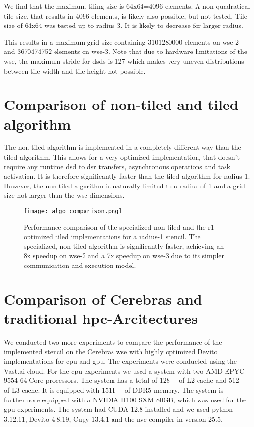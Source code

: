 We find that the maximum tiling size  is 64x64=4096 elements.
A non-quadratical tile size, that results in 4096 elements, is likely also possible, but not tested.
Tile size of 64x64 was tested up to radius 3. It is likely to decrease for larger radius.

This results in a maximum grid size containing \num{3101280000} elements on wse-2 and \num{3670474752} elements on wse-3.
Note that due to hardware limitations of the \ac{wse}, the maximum stride for \acp{dsd} is \num{127} which makes very uneven distributions between tile width and tile height not possible.


\section{Comparison of non-tiled and tiled algorithm}

The non-tiled algorithm is implemented in a completely different way than the tiled algorithm.
This allows for a very optimized implementation, that doesn't require any runtime \ac{dsd} to \ac{dsr} transfers, asynchronous operations and task activation.
It is therefore significantly faster than the tiled algorithm for radius 1.
However, the non-tiled algorithm is naturally limited to a radius of 1 and a grid size not larger than the \ac{wse} dimensions.

\begin{figure}[h]
    \centering
    \texttt{[image: algo\_comparison.png]}
    \caption{Performance comparison of the specialized non-tiled and the r1-optimized tiled implementations for a radius-1 stencil. The specialized, non-tiled algorithm is significantly faster, achieving an 8x speedup on \ac{wse}-2 and a 7x speedup on \ac{wse}-3 due to its simpler communication and execution model.}
    \label{fig:algo_comparison}
\end{figure}

\section{Comparison of Cerebras and traditional \ac{hpc}-Arcitectures}
We conducted two more experiments to compare the performance of the implemented stencil on the Cerebras \ac{wse} with highly optimized Devito implementations for \ac{cpu} and \ac{gpu}. The experiments were conducted using the Vast.ai cloud.
For the \ac{cpu} experiments we used a system with two AMD EPYC 9554 64-Core processors. The system has a total of \qty{128}{\mega\byte} of L2 cache and \qty{512}{\mega\byte} of L3 cache. It is equipped with \qty{1511}{\giga\byte} of DDR5 memory.
The system is furthermore equipped with a NVIDIA H100 SXM 80GB, which was used for the \ac{gpu} experiments. The system had CUDA 12.8 installed and we used python 3.12.11, Devito 4.8.19, Cupy 13.4.1 and the nvc compiler in version 25.5.

